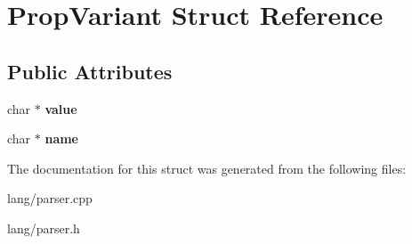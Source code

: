 \hypertarget{structPropVariant}{}\section{Prop\+Variant Struct Reference}
\label{structPropVariant}
\subsection*{Public Attributes}
\begin{DoxyCompactItemize}
\item 
\mbox{\label{structPropVariant_a1f1382147d7ab20c4340f604e0183e72}} 
char $\ast$ {\bfseries value}
\item 
\mbox{\label{structPropVariant_a64d96e187b1a15f0f4e12af92523610b}} 
char $\ast$ {\bfseries name}
\end{DoxyCompactItemize}


The documentation for this struct was generated from the following files\+:\begin{DoxyCompactItemize}
\item 
lang/parser.\+cpp\item 
lang/parser.\+h\end{DoxyCompactItemize}

